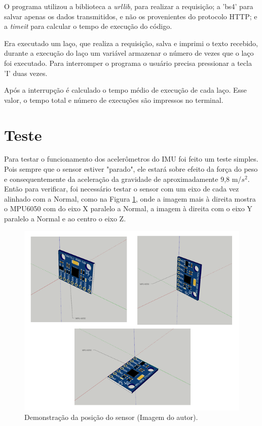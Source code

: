 	O programa utilizou a biblioteca a \textit{urllib}, para realizar a requisição; a 'bs4' para salvar apenas os dados transmitidos, e não os provenientes do protocolo HTTP; e a \textit{timeit} para calcular o tempo de execução do código.
	
	Era executado um laço, que realiza a requisição, salva e imprimi o texto recebido, durante a execução do laço um variável armazenar o número de vezes que o laço foi executado. Para interromper o programa o usuário precisa pressionar a tecla 'I' duas vezes. 
	
	Após a interrupção é calculado o tempo médio de execução de cada laço. Esse valor, o tempo total e número de execuções são impressos  no terminal.

\section {Teste}

	Para testar o funcionamento dos acelerômetros do IMU foi feito um teste simples. Pois sempre que o sensor estiver "parado", ele estará sobre efeito da força do peso e consequentemente da aceleração da gravidade de aproximadamente 9,8 m/$ s^2 $. Então para verificar, foi necessário testar o sensor com um eixo de cada vez alinhado com a Normal, como na Figura \ref{acel_validation}, onde a imagem mais à direita mostra o MPU6050 com do eixo X paralelo a Normal, a imagem à direita com o eixo Y paralelo a Normal e ao centro o eixo Z.
	
	\begin{figure}[h!]
		\centering
		\includegraphics[keepaspectratio=true,scale=0.8]{figuras/validacao_acel.PNG}
		\caption{Demonstração da posição do sensor (Imagem do autor).}
		 
		\label{acel_validation}	
	\end{figure}
	
